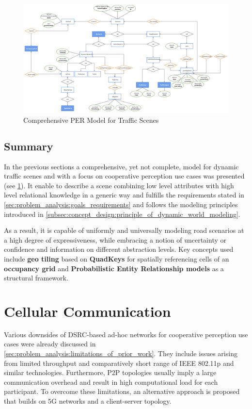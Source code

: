 \begin{figure}
	\centering
	\includegraphics[width=\linewidth]{98_images/scene_representation_er}
	\caption{Comprehensive PER Model for Traffic Scenes}
	\label{fig:final_model}
\end{figure}

\subsection{Summary}
\label{subsec:concept_design:modeling:summary}
In the previous sections a comprehensive, yet not complete, model for dynamic traffic scenes and with a focus on cooperative perception use cases was presented (see \cref{fig:final_model}). It enable to describe a scene combining low level attributes with high level relational knowledge in a generic way and fulfills the requirements stated in \cref{sec:problem_analysis:goals_requirements} and follows the modeling principles introduced in \cref{subsec:concept_design:principle_of_dynamic_world_modeling}.

As a result, it is capable of uniformly and universally modeling road scenarios at a high degree of expressiveness, while embracing a notion of uncertainty or confidence and information on different abstraction levels. Key concepts used include \textbf{geo tiling} based on \textbf{QuadKeys} for spatially referencing cells of an \textbf{occupancy grid} and \textbf{Probabilistic Entity Relationship models} as a structural framework.

\section{Cellular Communication}
\label{sec:concept_design:cellular_communication}
Various downsides of DSRC-based ad-hoc networks for cooperative perception use cases were already discussed in \cref{sec:problem_analysis:limitations_of_prior_work}. They include issues arising from limited throughput and comparatively short range of IEEE 802.11p and similar technologies. Furthermore, P2P topologies usually imply a large communication overhead and result in high computational load for each participant. To overcome these limitations, an alternative approach is proposed that builds on 5G networks and a client-server topology.

